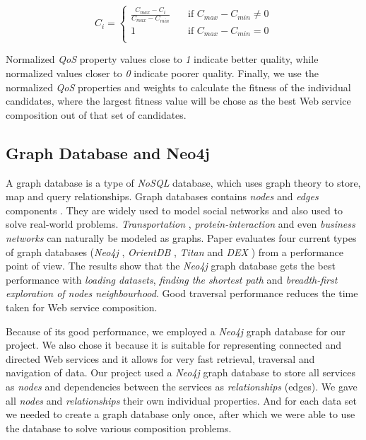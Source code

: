 \begin{equation}
C_i = \left\{
\begin{split}
     \frac{C_{max} - C_i}{C_{max} - C_{min}}      & \quad \text{if  } C_{max} - C_{min} \neq 0\\
    1  & \quad \text{if  } C_{max} - C_{min} = 0\\
\end{split}\right. 
\end{equation}

Normalized \emph{QoS} property values close to \emph{1} indicate better quality, while normalized values closer to \emph{0} indicate poorer quality. Finally, we use the normalized \emph{QoS} properties and weights to calculate the fitness of the individual candidates, where the largest fitness value will be chose as the best Web service composition out of that set of candidates. 

\subsection{Graph Database and Neo4j}
A graph database is a type of \emph{NoSQL} database, which uses graph theory to store, map and query relationships. Graph databases contains \emph{nodes} and \emph{edges} components \cite{30}. They are widely used to model social networks and also used to solve real-world problems. \emph{Transportation} \cite{32}, \emph{protein-interaction} \cite{33} and even \emph{business networks} \cite{34} can naturally be modeled as graphs. Paper \cite{30} evaluates four current types of graph databases (\emph{Neo4j} \cite{6}, \emph{OrientDB} \cite{35}, \emph{Titan} \cite{36} and \emph{DEX} \cite{37})  from a performance point of view. The results show that the \emph{Neo4j} graph database gets the best performance with \emph{loading datasets}, \emph{finding the shortest path} and \emph{breadth-first exploration of nodes neighbourhood}. Good traversal performance reduces the time taken for Web service composition. \par

Because of its good performance, we employed a \emph{Neo4j} \cite{6} graph database for our project. We also chose it because it is suitable for representing connected and directed Web services and it allows for very fast retrieval, traversal and navigation of data. Our project used a \emph{Neo4j} graph database to store all services as \emph{nodes} and dependencies between the services as \emph{relationships} (edges). We gave all \emph{nodes} and \emph{relationships} their own individual properties. And for each data set we needed to create a graph database only once, after which we were able to use the database to solve various composition problems. \par

